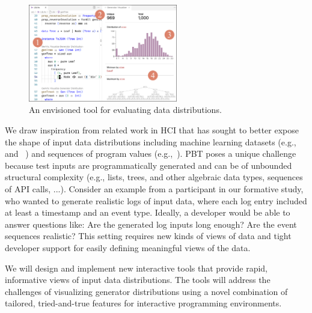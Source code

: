 \begin{figure}
  \centering
  \includegraphics[width=0.58\textwidth]{assets/gen-vis.pdf}
  \caption{An envisioned tool for evaluating data distributions.
    }\label{fig:gen-vis}
\end{figure}

We draw inspiration from related work in HCI that has sought to better expose
the shape of input data distributions including
machine learning datasets
(e.g.,~\cite{ref:hohman2019gamut} and
~\cite{ref:hohman2020understanding}) and sequences of program values
(e.g.,~\cite{ref:kang2017omnicode}).
PBT poses a unique challenge because test inputs are
programmatically generated and
can be of unbounded structural
complexity (e.g., lists, trees, and other algebraic data types,
sequences of API calls, ...).
Consider an
example from a participant in our formative study, who wanted to generate
realistic logs of input data, where each log entry included at least a timestamp
and an event type.
Ideally, a developer would be able to answer
questions like: Are the generated log inputs long enough? Are the
event sequences
realistic? This setting requires new kinds of views of data and tight
developer support for easily defining meaningful views of the data.

We will design and implement new interactive tools that provide rapid,
informative views of input data distributions. The tools will address the
challenges of visualizing generator distributions using a novel combination of
tailored, tried-and-true features for interactive programming environments.

